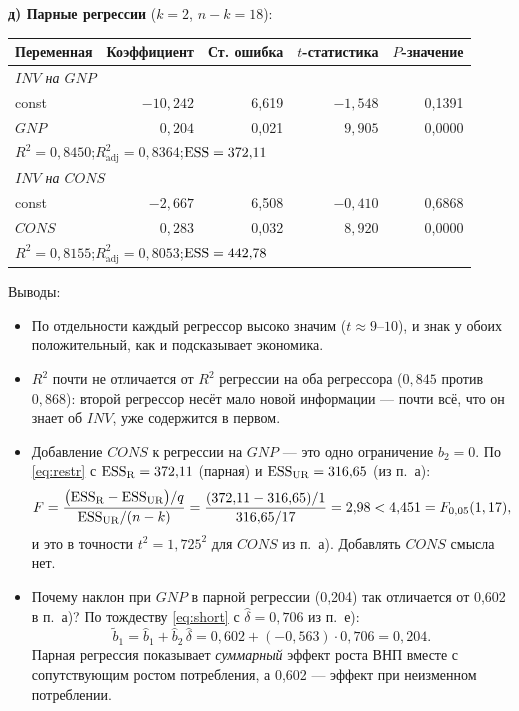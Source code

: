 \begin{solution}
\medskip
\textbf{д) Парные регрессии} ($k = 2$, $n - k = 18$):
\begin{center}
\begin{tabular}{lrrrr}
\toprule
Переменная & Коэффициент & Ст. ошибка & $t$-статистика & $P$-значение \\
\midrule
\multicolumn{5}{l}{\emph{$\mathit{INV}$ на $\mathit{GNP}$}} \\
const          & $-10{,}242$ & 6,619 & $-1{,}548$ & 0,1391 \\
$\mathit{GNP}$ & $\phantom{-}0{,}204$ & 0,021 & $9{,}905$ & 0,0000 \\
\multicolumn{5}{l}{$R^2 = 0{,}8450$;\quad $R^2_{\text{adj}} = 0{,}8364$;\quad $\mathrm{ESS} = 372{,}11$} \\
\midrule
\multicolumn{5}{l}{\emph{$\mathit{INV}$ на $\mathit{CONS}$}} \\
const           & $-2{,}667$ & 6,508 & $-0{,}410$ & 0,6868 \\
$\mathit{CONS}$ & $\phantom{-}0{,}283$ & 0,032 & $8{,}920$ & 0,0000 \\
\multicolumn{5}{l}{$R^2 = 0{,}8155$;\quad $R^2_{\text{adj}} = 0{,}8053$;\quad $\mathrm{ESS} = 442{,}78$} \\
\bottomrule
\end{tabular}
\end{center}
Выводы:
\begin{itemize}[leftmargin=2.2em, itemsep=2pt]
  \item По отдельности каждый регрессор высоко значим ($t \approx 9$--$10$), и
        знак у обоих положительный, как и подсказывает экономика.
  \item $R^2$ почти не отличается от $R^2$ регрессии на оба регрессора
        ($0{,}845$ против $0{,}868$): второй регрессор несёт мало новой
        информации — почти всё, что он знает об $\mathit{INV}$, уже содержится
        в первом.
  \item Добавление $\mathit{CONS}$ к регрессии на $\mathit{GNP}$ — это одно
        ограничение $b_2 = 0$. По \eqref{eq:restr} с
        $\mathrm{ESS}_{\mathrm{R}} = 372{,}11$ (парная) и $\mathrm{ESS}_{\mathrm{UR}} = 316{,}65$
        (из п.~а):
        \[
          F = \frac{\bigl(\mathrm{ESS}_{\mathrm{R}} - \mathrm{ESS}_{\mathrm{UR}}\bigr)/q}
                   {\mathrm{ESS}_{\mathrm{UR}}/(n-k)}
            = \frac{(372{,}11 - 316{,}65)/1}{316{,}65/17}
            = 2{,}98 < 4{,}451 = F_{0{,}05}(1, 17),
        \]
        и это в точности $t^2 = 1{,}725^2$ для $\mathit{CONS}$ из п.~а).
        Добавлять $\mathit{CONS}$ смысла нет.
  \item Почему наклон при $\mathit{GNP}$ в парной регрессии (0,204) так
        отличается от 0,602 в п.~а)? По тождеству \eqref{eq:short} с
        $\widehat{\delta} = 0{,}706$ из п.~е):
        \[
          \widetilde{b}_1 = \widehat{b}_1 + \widehat{b}_2\,\widehat{\delta}
                          = 0{,}602 + (-0{,}563)\cdot 0{,}706 = 0{,}204 .
        \]
        Парная регрессия показывает \emph{суммарный} эффект роста ВНП вместе с
        сопутствующим ростом потребления, а 0,602 — эффект при неизменном
        потреблении.
\end{itemize}


\end{solution}
